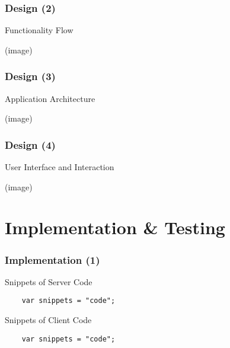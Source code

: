 \documentclass[10pt, compress]{beamer}
\begin{document}

\begin{frame}[fragile]
  \frametitle{Design (2)}

  \begin{center}
  Functionality Flow

  (image)
  \end{center}

\end{frame}


\begin{frame}[fragile]
  \frametitle{Design (3)}

  \begin{center}
  Application Architecture

  (image)
  \end{center}

\end{frame}


\begin{frame}[fragile]
  \frametitle{Design (4)}

  \begin{center}
  User Interface and Interaction

  (image)
  \end{center}

\end{frame}


\section{Implementation \& Testing}


\begin{frame}[fragile]
  \frametitle{Implementation (1)}

  Snippets of Server Code
  \begin{verbatim}
    var snippets = "code";
  \end{verbatim}

  Snippets of Client Code
  \begin{verbatim}
    var snippets = "code";
  \end{verbatim}

\end{frame}
\end{document}
